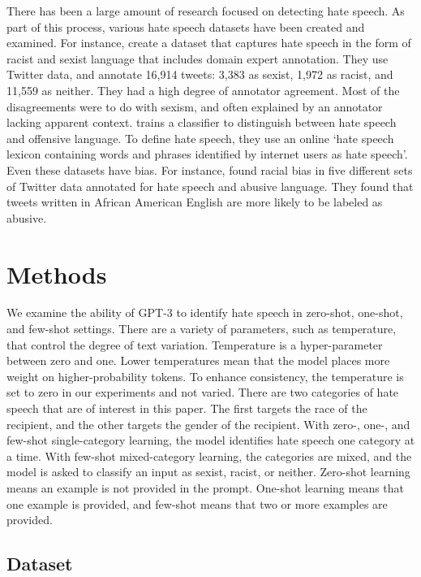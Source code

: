 \documentclass{bmcart}
\begin{document}
There has been a large amount of research focused on detecting hate speech. As part of this process, various hate speech datasets have been created and examined. For instance, \cite{waseem2016hateful} create a dataset that captures hate speech in the form of racist and sexist language that includes domain expert annotation. They use Twitter data, and annotate 16,914 tweets: 3,383 as sexist, 1,972 as racist, and 11,559 as neither. They had a high degree of annotator agreement. Most of the disagreements were to do with sexism, and often explained by an annotator lacking apparent context. \cite{davidson2017automated} trains a classifier to distinguish between hate speech and offensive language. To define hate speech, they use an online `hate speech lexicon containing words and phrases identified by internet users as hate speech'. Even these datasets have bias. For instance, \cite{davidson2019racial} found racial bias in five different sets of Twitter data annotated for hate speech and abusive language. They found that tweets written in African American English are more likely to be labeled as abusive.

\section{Methods}\label{methods}

We examine the ability of GPT-3 to identify hate speech in zero-shot, one-shot, and few-shot settings. There are a variety of parameters, such as temperature, that control the degree of text variation. Temperature is a hyper-parameter between zero and one. Lower temperatures mean that the model places more weight on higher-probability tokens. To enhance consistency, the temperature is set to zero in our experiments and not varied. There are two categories of hate speech that are of interest in this paper. The first targets the race of the recipient, and the other targets the gender of the recipient. With zero-, one-, and few-shot single-category learning, the model identifies hate speech one category at a time. With few-shot mixed-category learning, the categories are mixed, and the model is asked to classify an input as sexist, racist, or neither. Zero-shot learning means an example is not provided in the prompt. One-shot learning means that one example is provided, and few-shot means that two or more examples are provided.

\subsection{Dataset}\label{dataset}
\end{document}

